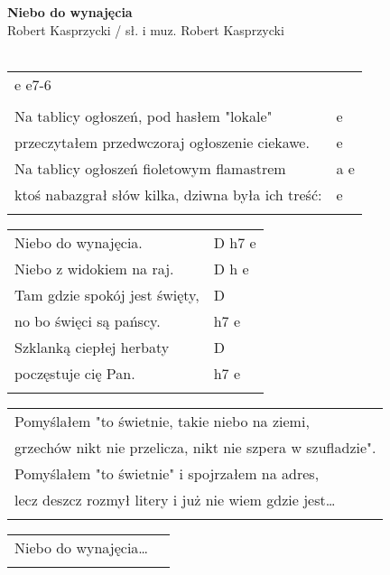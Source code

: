 \documentclass[a5paper]{article}
\begin{document}


\noindent
\fontsize{12pt}{15pt}\selectfont
\textbf{Niebo do wynajęcia} \\
\fontsize{8pt}{10pt}\selectfont
Robert Kasprzycki / sł. i muz. Robert Kasprzycki \\ \\
\fontsize{10pt}{12pt}\selectfont
{}
\begin{tabular}{@{}p{8.50cm}p{3cm}@{}}
\noindent
e e7-6  \\ \\
Na tablicy ogłoszeń, pod hasłem "lokale" & e \\
przeczytałem przedwczoraj ogłoszenie ciekawe. & e \\		
Na tablicy ogłoszeń fioletowym flamastrem & a e \\
ktoś nabazgrał słów kilka, dziwna była ich treść: & e \\ \\
\end{tabular}

\noindent
\begin{tabular}{@{}p{7.50cm}p{3cm}@{}}
Niebo do wynajęcia. & D h7 e \\
Niebo z widokiem na raj.	& D h e\\
Tam gdzie spokój jest święty, & D \\
no bo święci są pańscy. & h7 e \\
Szklanką ciepłej herbaty & D \\
poczęstuje cię Pan. & h7 e \\ \\
\end{tabular}

\noindent
\begin{tabular}{@{}p{9.50cm}@{}}
Pomyślałem "to świetnie, takie niebo na ziemi, \\
grzechów nikt nie przelicza, nikt nie szpera w szufladzie". \\
Pomyślałem "to świetnie" i spojrzałem na adres, \\
lecz deszcz rozmył litery i już nie wiem gdzie jest… \\ \\
\end{tabular}

\noindent
\begin{tabular}{@{}p{7.50cm}p{3cm}@{}}
Niebo do wynajęcia… \\ \\
\end{tabular}
\end{document}
